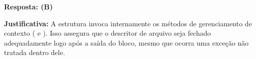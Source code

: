 \ifmostrarGabarito
\textbf{Resposta: (B)}

\textbf{Justificativa:}
A estrutura  invoca internamente os métodos de gerenciamento de contexto ( e ). Isso assegura que o descritor de arquivo seja fechado adequadamente logo após a saída do bloco, mesmo que ocorra uma exceção não tratada dentro dele.

\fi
